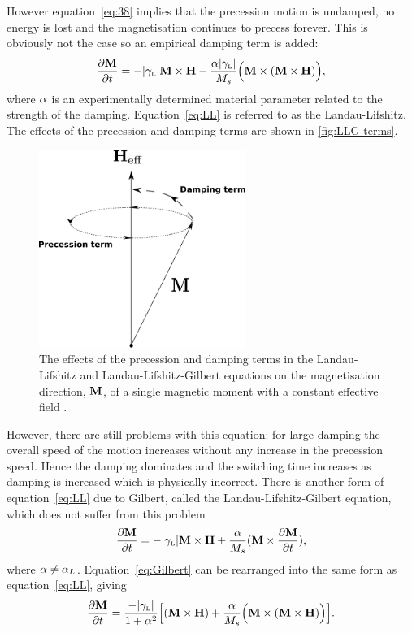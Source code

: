However equation~\eqref{eq:38} implies that the precession motion is undamped, \ie no energy is lost and the magnetisation continues to precess forever. This is obviously not the case so an empirical damping term is added:
\begin{equation}
  \label{eq:LL}
  \frac{\partial \mathbf{M}}{\partial t} = - {\left|{\gamma_{\text{\tiny{L}}}} \right|} \mathbf{M} \times \mathbf{H} - \frac{\alpha {\left|{\gamma_{\text{\tiny{L}}}} \right|}}{M_s} \Big( \mathbf{M} \times (\mathbf{M} \times \mathbf{H}) \Big),
\end{equation}
where $\alpha$ is an experimentally determined material parameter related to the strength of the damping. Equation~\eqref{eq:LL} is referred to as the Landau-Lifshitz.\cite{Landau1935} The effects of the precession and damping terms are shown in \autoref{fig:LLG-terms}.

\begin{figure}[ht!]
  \centering
  \includegraphics[width=0.6\textwidth]{./images/LLG-terms}
  \caption{The effects of the precession and damping terms in the Landau-Lifshitz and Landau-Lifshitz-Gilbert equations on the magnetisation direction, $\mathbf{M}$, of a single magnetic moment with a constant effective field
.}
  \label{fig:LLG-terms}
\end{figure}

However, there are still problems with this equation: for large damping the overall speed of the
motion increases without any increase in the precession speed. Hence the damping dominates and the switching time increases as damping is increased which is physically incorrect.\cite{Mallinson1987} There is another form of equation~\eqref{eq:LL} due to Gilbert\cite{Gilbert2004}, called the Landau-Lifshitz-Gilbert equation, which does not suffer from this problem
\begin{equation}
  \label{eq:Gilbert}
  \frac{\partial \mathbf{M}}{\partial t} = - {\left|{\gamma_{\text{\tiny{L}}}} \right|} \mathbf{M} \times \mathbf{H} + \frac{\alpha}{M_s} (\mathbf{M} \times \frac{\partial \mathbf{M}}{\partial t}),
\end{equation}
where $\alpha \neq \alpha_L$. Equation~\eqref{eq:Gilbert} can be rearranged into the same form as equation~\eqref{eq:LL}, giving
\begin{equation}
  \label{eq:LLG}
  \frac{\partial \mathbf{M}}{\partial t} = \frac{-{\left|{\gamma_{\text{\tiny{L}}}} \right|}}{1 + \alpha^2} \Big[ (\mathbf{M} \times \mathbf{H}) + \frac{\alpha}{M_s} \Big(\mathbf{M} \times (\mathbf{M} \times \mathbf{H}) \Big) \Big].
\end{equation}

